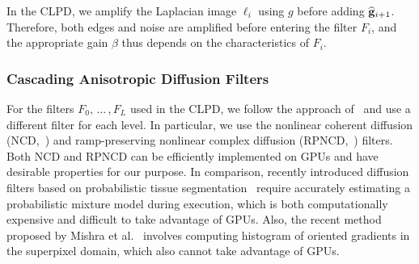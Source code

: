 In the CLPD, we amplify the Laplacian image \({\boldsymbol\ell}_i\) using \(g\) before adding \(\widehat{\mathbf{g}}_{i+1}\).
Therefore, both edges and noise are amplified before entering the filter \(F_i\), and the appropriate gain \(\beta\) thus depends on the characteristics of \(F_i\).

\subsubsection{Cascading Anisotropic Diffusion Filters}
For the filters \(F_0,\,\ldots\,, F_L\) used in the CLPD, we follow the approach of~\cite{kang_new_2016} and use a different filter for each level.
In particular, we use the nonlinear coherent diffusion (NCD,~\cite{abd-elmoniem_realtime_2002}) and ramp-preserving nonlinear complex diffusion (RPNCD,~\cite{gilboa_image_2004}) filters.
Both NCD and RPNCD can be efficiently implemented on GPUs and have desirable properties for our purpose.
In comparison, recently introduced diffusion filters based on probabilistic tissue segmentation~\cite{vegas-sanchez-ferrero_probabilisticdriven_2010, ramos-llorden_anisotropic_2015} require accurately estimating a probabilistic mixture model during execution, which is both computationally expensive and difficult to take advantage of GPUs.
Also, the recent method proposed by Mishra et al.~\cite{mishra_edge_2018} involves computing histogram of oriented gradients in the superpixel domain, which also cannot take advantage of GPUs.
%
